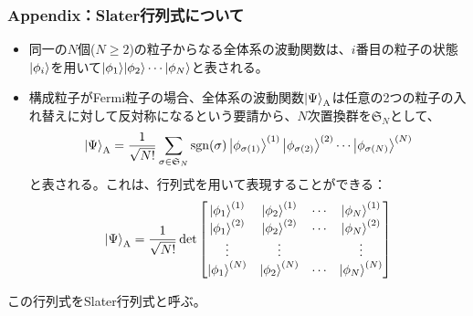 \documentclass[14pt,aspectratio=169,xcolor=dvipsnames,table,dvipdfmx]{beamer}
\DeclareMathOperator{\sgn}{sgn}
\theoremstyle{definition}
\begin{document}
\begin{frame}
  \frametitle{Appendix：Slater行列式について}
  \small
  \begin{itemize}
    \item 同一の$N$個($N\geq 2$)の粒子からなる全体系の波動関数は、$i$番目の粒子の状態$\ket{\phi_i}$を用いて$\ket{\phi_1}\!\ket{\phi_2}\cdots\ket{\phi_N}$と表される。
    \item 構成粒子がFermi粒子の場合、全体系の波動関数$\ket{\Psi}_{\text{A}}$は任意の2つの粒子の入れ替えに対して反対称になるという要請から、$N$次置換群を$\mathfrak{S}_{N}$として、
          \begin{equation*}
            \ket{\Psi}_{\text{A}}=\frac{1}{\sqrt{N!}}\sum_{\sigma\in\mathfrak{S}_N}
            \sgn(\sigma)\ket{\phi_{\sigma(1)}}^{(1)}\ket{\phi_{\sigma(2)}}^{(2)}\cdots\ket{\phi_{\sigma(N)}}^{(N)}
          \end{equation*}
          と表される。これは、行列式を用いて表現することができる：
          \begin{equation*}
            \ket{\Psi}_{\text{A}}=\frac{1}{\sqrt{N!}}\det
            \begin{bmatrix}
              \ket{\phi_{1}}^{(1)} & \ket{\phi_2}^{(1)} & \cdots & \ket{\phi_N}^{(1)} \\
              \ket{\phi_{1}}^{(2)} & \ket{\phi_2}^{(2)} & \cdots & \ket{\phi_N}^{(2)} \\
              \vdots               & \vdots             &        & \vdots             \\
              \ket{\phi_{1}}^{(N)} & \ket{\phi_2}^{(N)} & \cdots & \ket{\phi_N}^{(N)}
            \end{bmatrix}
          \end{equation*}
  \end{itemize}
  この行列式をSlater行列式と呼ぶ。
\end{frame}
\end{document}
